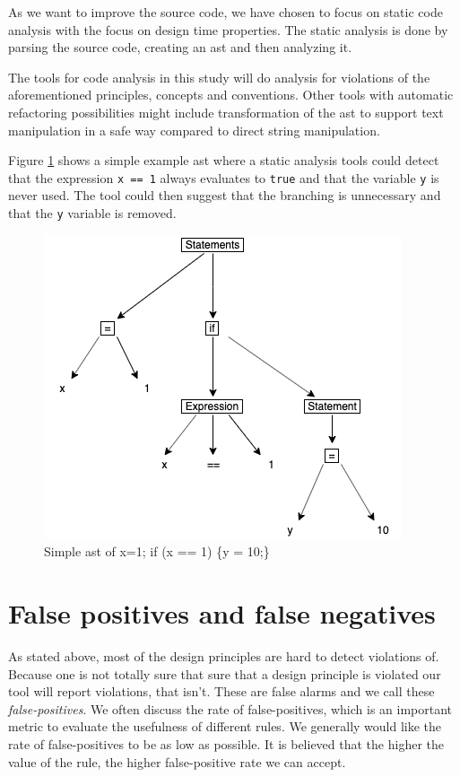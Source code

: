 \documentclass{report}
\begin{document}
As we want to improve the source code, we have chosen to focus on static code analysis with the focus on design time properties. The static analysis is done by parsing the source code, creating an \gls{ast} and then analyzing it.


The tools for code analysis in this study  will do analysis for violations of the aforementioned principles, concepts and conventions. Other tools with automatic refactoring possibilities might include transformation of the \gls{ast} to support text manipulation in a safe way compared to direct string manipulation. 




Figure \ref{fig:ast} shows a simple example \gls{ast} where a static analysis tools could detect that the expression \texttt{x == 1} always evaluates to \texttt{true} and that the variable \texttt{y} is never used. The tool could then suggest that the branching is unnecessary and that the \texttt{y} variable is removed.  

\begin{figure}[h!]
	\centering
	\includegraphics[width=\linewidth/2]{report/images/ast.png}
	\caption{Simple \gls{ast} of x=1; if (x == 1) \{y = 10;\}}
	\label{fig:ast}
\end{figure}



\section{False positives and false negatives}
As stated above, most of the design principles are hard to detect violations of. Because one is not totally sure that sure that a design principle is violated our tool will report violations, that isn't. These are false alarms and we call these \textit{false-positives}. We often discuss the rate of false-positives, which is an important metric to evaluate the usefulness of different rules. We generally would like the rate of false-positives to be as low as possible. It is believed that the higher the value of the rule, the higher false-positive rate we can accept. 
\end{document}
